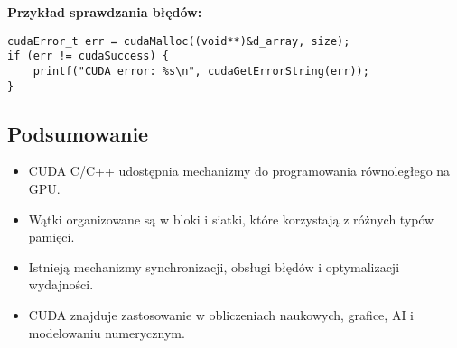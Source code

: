 \textbf{Przykład sprawdzania błędów:}
\begin{verbatim}
cudaError_t err = cudaMalloc((void**)&d_array, size);
if (err != cudaSuccess) {
    printf("CUDA error: %s\n", cudaGetErrorString(err));
}
\end{verbatim}

\subsection{Podsumowanie}
\begin{itemize}
    \item CUDA C/C++ udostępnia mechanizmy do programowania równoległego na GPU.
    \item Wątki organizowane są w bloki i siatki, które korzystają z różnych typów pamięci.
    \item Istnieją mechanizmy synchronizacji, obsługi błędów i optymalizacji wydajności.
    \item CUDA znajduje zastosowanie w obliczeniach naukowych, grafice, AI i modelowaniu numerycznym.
\end{itemize}
